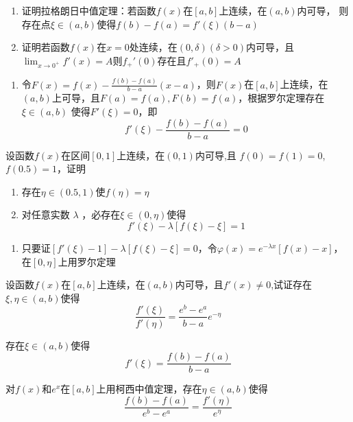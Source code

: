 \documentclass{article}
\begin{document}
\begin{examplle}[]
\begin{enumerate}
\item 证明拉格朗日中值定理：若函数\(f(x)\)在\([a,b]\)上连续，在\((a,b)\)内可导，
则存在点\(\xi\in(a,b)\)使得\(f(b)-f(a)=f'(\xi)(b-a)\)
\item 证明若函数\(f(x)\)在\(x=0\)处连续，在\((0,\delta)(\delta>0)\)内可导，且
\(\lim_{x\to0^+}f'(x)=A\)则\(f_+'(0)\)存在且\(f'_+(0)=A\)
\end{enumerate}


\begin{enumerate}
\item 令\(F(x)=f(x)-\frac{f(b)-f(a)}{b-a}(x-a)\)，则\(F(x)\)在\([a,b]\)上连续，在
\((a,b)\)上可导，且\(F(a)=f(a),F(b)=f(a)\)，根据罗尔定理存在\(\xi\in(a,b)\)
使得\(F'(\xi)=0\)，即
\begin{equation*}
f'(\xi)-\frac{f(b)-f(a)}{b-a}=0
\end{equation*}
\end{enumerate}
\end{examplle}

\begin{examplle}[]
设函数\(f(x)\)在区间\([0,1]\)上连续，在\((0,1)\)内可导,且
\(f(0)=f(1)=0\),\(f(0.5)=1\)，证明
\begin{enumerate}
\item 存在\(\eta\in(0.5,1)\)使\(f(\eta)=\eta\)
\item 对任意实数 \(\lambda\) ，必存在\(\xi\in(0,\eta)\)使得
\begin{equation*}
f'(\xi)-\lambda[f(\xi)-\xi]=1
\end{equation*}
\end{enumerate}


\begin{enumerate}
\item 只要证\([f'(\xi)-1]-\lambda[f(\xi)-\xi]=0\)，令\(\varphi(x)=e^{-\lambda x}[f(x)-x]\)，
在\([0,\eta]\)上用罗尔定理
\end{enumerate}
\end{examplle}

\begin{examplle}[]
设函数\(f(x)\)在\([a,b]\)上连续，在\((a,b)\)内可导，且\(f'(x)\neq0\),试证存在
\(\xi,\eta\in(a,b)\)使得
\begin{equation*}
\frac{f'(\xi)}{f'(\eta)}=\frac{e^b-e^a}{b-a}e^{-\eta}
\end{equation*}

存在\(\xi\in(a,b)\)使得
\begin{equation*}
f'(\xi)=\frac{f(b)-f(a)}{b-a}
\end{equation*}

对\(f(x)\)和\(e^x\)在\([a,b]\)上用柯西中值定理，存在\(\eta\in(a,b)\)使得
\begin{equation*}
\frac{f(b)-f(a)}{e^b-e^a}=\frac{f'(\eta)}{e^\eta}
\end{equation*}
\end{examplle}
\end{document}
